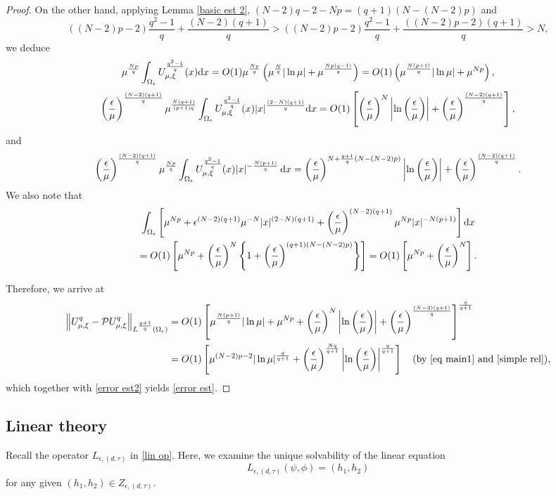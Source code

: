 \documentclass[reqno]{amsart}
\theoremstyle{remark}
\newcommand{\ep}{\epsilon}
\newcommand{\mcp}{\mathcal{P}}
\newcommand{\dx}{\textup{d}x}
\newcommand{\mx}{{\mu,\xi}}
\renewcommand{\(}{\left(}
\renewcommand{\)}{\right)}
\numberwithin{equation}{section}
\begin{document}
\begin{proof}
On the other hand, applying Lemma \ref{basic est 2}, $(N-2)q-2-Np = (q+1)(N-(N-2)p)$ and
$$
((N-2)p-2)\frac{q^2-1}{q} + \frac{(N-2)(q+1)}{q} > ((N-2)p-2)\frac{q^2-1}{q}+\frac{((N-2)p-2)(q+1)}{q} > N,
$$
we deduce
\[\mu^{\frac{Np}{q}}\int_{\Omega_\ep}U_\mx^{\frac{q^2-1}{q}}(x)\dx = O(1)\mu^{\frac{Np}{q}} \(\mu^{\frac{N}{q}}|\ln \mu|+\mu^{\frac{Np(q-1)}{q}}\) = O(1)\(\mu^{\frac{N(p+1)}{q}}|\ln \mu|+\mu^{Np}\),\]
\[\(\frac{\ep}{\mu}\)^{\frac{(N-2)(q+1)}{q}}\mu^{\frac{N(q+1)}{(p+1)q}} \int_{\Omega_\ep} U_\mx^{\frac{q^2-1}{q}}(x) |x|^{\frac{(2-N)(q+1)}{q}} \dx
= O(1) \left[\(\frac{\ep}{\mu}\)^N\left|\ln\(\frac{\ep}{\mu}\)\right| + \(\frac{\ep}{\mu}\)^{\frac{(N-2)(q+1)}{q}}\right],\]
and
\[\(\frac{\ep}{\mu}\)^{\frac{(N-2)(q+1)}{q}}\mu^{\frac{Np}{q}} \int_{\Omega_\ep}U_\mx^{\frac{q^2-1}{q}}(x)|x|^{-\frac{N(p+1)}{q}}\, \dx
= \(\frac{\ep}{\mu}\)^{N+\frac{q+1}{q}(N-(N-2)p)}\left|\ln\(\frac{\ep}{\mu}\)\right| + \(\frac{\ep}{\mu}\)^{\frac{(N-2)(q+1)}{q}}.\]
We also note that
\begin{multline*}
\int_{\Omega_\ep} \left[\mu^{Np} + \ep^{(N-2)(q+1)}\mu^{-N} |x|^{(2-N)(q+1)} + \(\frac{\ep}{\mu}\)^{(N-2)(q+1)}\mu^{Np} |x|^{-N(p+1)}\right] \dx\\
=O(1)\left[\mu^{Np} + \(\frac{\ep}{\mu}\)^N\left\{1+\(\frac{\ep}{\mu}\)^{(q+1)(N-(N-2)p)}\right\}\right] = O(1)\left[\mu^{Np} + \(\frac{\ep}{\mu}\)^N\right].
\end{multline*}

Therefore, we arrive at
\begin{align*}
\left\|U_\mx^q-\mcp U_\mx^q\right\|_{L^{\frac{q+1}{q}}(\Omega_\ep)}
&= O(1)\left[\mu^{\frac{N(p+1)}{q}}|\ln \mu| + \mu^{Np} + \(\frac{\ep}{\mu}\)^N \left|\ln\(\frac{\ep}{\mu}\)\right| + \(\frac{\ep}{\mu}\)^{\frac{(N-2)(q+1)}{q}}\right]^\frac{q}{q+1}\\
&= O(1)\left[\mu^{(N-2)p-2}|\ln \mu|^{\frac{q}{q+1}}+ \(\frac{\ep}{\mu}\)^{\frac{Nq}{q+1}} \left|\ln\(\frac{\ep}{\mu}\)\right|^{\frac{q}{q+1}} \right] \quad \textup{(by \eqref{eq main1} and \eqref{simple rel})},
\end{align*}
which together with \eqref{error est2} yields \eqref{error est}.
\end{proof}


\subsection{Linear theory}
Recall the operator $L_{\ep,(d,\tau)}$ in \eqref{lin op}. Here, we examine the unique solvability of the linear equation
\begin{equation}\label{lin eq}
L_{\ep,(d,\tau)}(\psi,\phi) = (h_1,h_2)
\end{equation}
for any given $(h_1,h_2) \in Z_{\ep,(d,\tau)}$.
\end{document}

